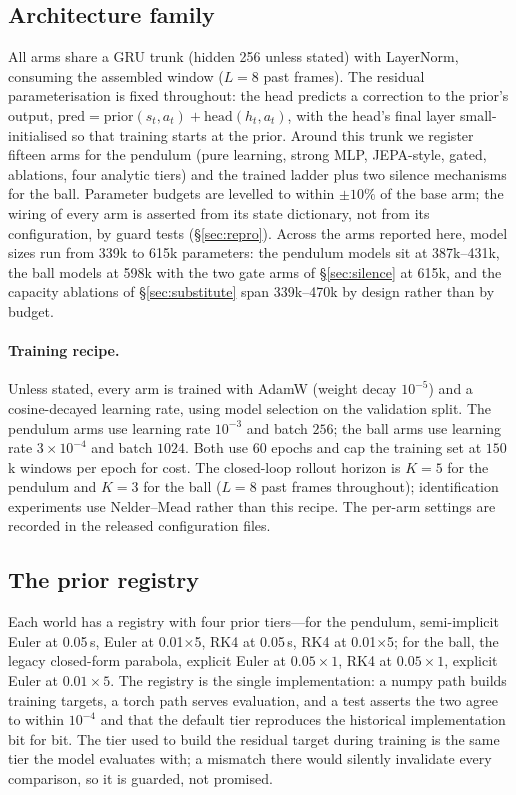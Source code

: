 \documentclass{article}
\begin{document}
\subsection{Architecture family}

All arms share a GRU trunk (hidden 256 unless stated) with LayerNorm, consuming the assembled window ($L{=}8$ past frames). The residual parameterisation is fixed throughout: the head predicts a correction to the prior's output, $\mathrm{pred} = \mathrm{prior}(s_t, a_t) + \mathrm{head}(h_t, a_t)$, with the head's final layer small-initialised so that training starts at the prior. Around this trunk we register fifteen arms for the pendulum (pure learning, strong MLP, JEPA-style, gated, ablations, four analytic tiers) and the trained ladder plus two silence mechanisms for the ball. Parameter budgets are levelled to within $\pm 10\%$ of the base arm; the wiring of every arm is asserted from its state dictionary, not from its configuration, by guard tests (\S\ref{sec:repro}). Across the arms reported here, model sizes run from 339k to 615k parameters: the pendulum models sit at 387k--431k, the ball models at 598k with the two gate arms of \S\ref{sec:silence} at 615k, and the capacity ablations of \S\ref{sec:substitute} span 339k--470k by design rather than by budget.

\paragraph{Training recipe.} Unless stated, every arm is trained with AdamW (weight decay $10^{-5}$) and a cosine-decayed learning rate, using model selection on the validation split. The pendulum arms use learning rate $10^{-3}$ and batch $256$; the ball arms use learning rate $3\times10^{-4}$ and batch $1024$. Both use $60$ epochs and cap the training set at $150$k windows per epoch for cost. The closed-loop rollout horizon is $K{=}5$ for the pendulum and $K{=}3$ for the ball ($L{=}8$ past frames throughout); identification experiments use Nelder--Mead rather than this recipe. The per-arm settings are recorded in the released configuration files.

\subsection{The prior registry}

Each world has a registry with four prior tiers---for the pendulum, semi-implicit Euler at 0.05\,s, Euler at 0.01$\times$5, RK4 at 0.05\,s, RK4 at 0.01$\times$5; for the ball, the legacy closed-form parabola, explicit Euler at $0.05{\times}1$, RK4 at $0.05{\times}1$, explicit Euler at $0.01{\times}5$. The registry is the single implementation: a numpy path builds training targets, a torch path serves evaluation, and a test asserts the two agree to within $10^{-4}$ and that the default tier reproduces the historical implementation bit for bit. The tier used to build the residual target during training is the same tier the model evaluates with; a mismatch there would silently invalidate every comparison, so it is guarded, not promised.
\end{document}
